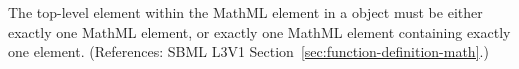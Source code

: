The top-level element within the MathML  element in a
\FunctionDefinition object must be either exactly one MathML 
element, or exactly one MathML  element containing exactly
one  element.  (References: SBML L3V1
Section~\ref{sec:function-definition-math}.)
